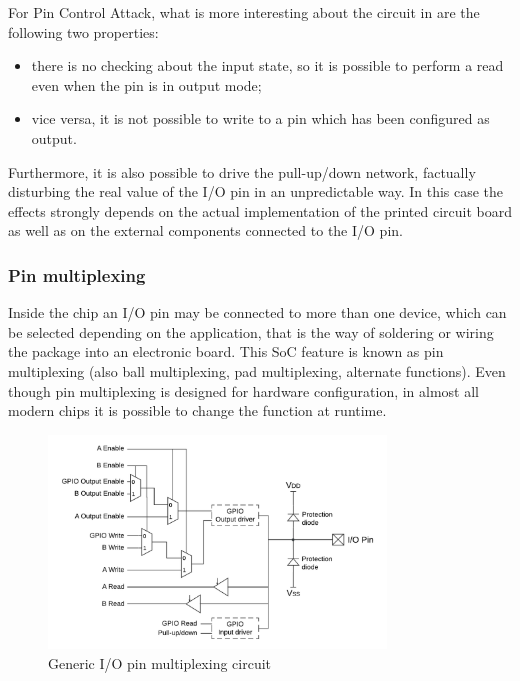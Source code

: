 For Pin Control Attack, what is more interesting about the circuit in \myfig{\ref{fig:pinconf}} are the following two properties:
\begin{itemize}
	\item there is no checking about the input state, so it is possible to perform a read even when the pin is in output mode;
	\item vice versa, it is not possible to write to a pin which has been configured as output.
\end{itemize}

Furthermore, it is also possible to drive the pull-up/down network, factually disturbing the real value of the I/O pin in an unpredictable way.
In this case the effects strongly depends on the actual implementation of the printed circuit board as well as on the external components connected to the I/O pin.


\subsubsection{Pin multiplexing}

Inside the chip an I/O pin may be connected to more than one device, which can be selected depending on the application,
that is the way of soldering or wiring the package into an electronic board.
This SoC feature is known as pin multiplexing (also ball multiplexing, pad multiplexing, alternate functions).
Even though pin multiplexing is designed for hardware configuration, in almost all modern chips it is possible to change the function at runtime.

\begin{figure}[h]
\centerline{\includegraphics[width=0.8\textwidth]{res/pinmux}}
\caption{Generic I/O pin multiplexing circuit \label{fig:pinmux}}
\end{figure}

